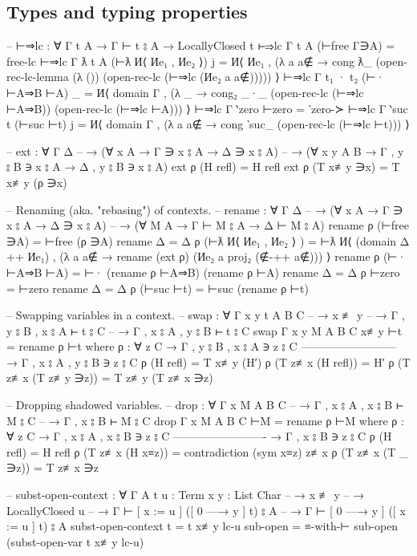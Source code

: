 \documentclass[logo,bsc,singlespacing,parskip,online]{infthesis}
\renewenvironment{code}{\mintedcopy[breaklines,breaksymbolleft=\;]{agda}}{\endmintedcopy}
\begin{document}
\subsection{Types and typing properties}
\label{appendix:types_proofs}
\begin{code}
-- ⊢⇒lc : ∀ {Γ t A} → Γ ⊢ t ⦂ A → LocallyClosed t
⊢⇒lc {Γ} {t} {A} (⊢free Γ∋A) = free-lc
⊢⇒lc {Γ} {ƛ t} {A} (⊢ƛ И⟨ Иe₁ ,  Иe₂ ⟩) j =
  И⟨ Иe₁ , (λ a {a∉} → cong ƛ_
    (open-rec-lc-lemma
      (λ ())
      (open-rec-lc (⊢⇒lc (Иe₂ a {a∉}))))) ⟩
⊢⇒lc {Γ} {t₁ · t₂} (⊢· ⊢A⇒B ⊢A) _ =
  И⟨ domain Γ , (λ _ → cong₂ _·_
    (open-rec-lc (⊢⇒lc ⊢A⇒B)) (open-rec-lc (⊢⇒lc ⊢A))) ⟩
⊢⇒lc {Γ} {‵zero} ⊢zero = ‵zero-≻
⊢⇒lc {Γ} {‵suc t} (⊢suc ⊢t) j =
  И⟨ domain Γ , (λ a {a∉} →
    cong ‵suc_ (open-rec-lc (⊢⇒lc ⊢t))) ⟩

-- ext : ∀ {Γ Δ}
--   → (∀ {x A}     →         Γ ∋ x ⦂ A →         Δ ∋ x ⦂ A)
--   → (∀ {x y A B} → Γ , y ⦂ B ∋ x ⦂ A → Δ , y ⦂ B ∋ x ⦂ A)
ext ρ (H refl) = H refl
ext ρ (T x≢y ∋x) = T x≢y (ρ ∋x)

-- Renaming (aka. "rebasing") of contexts.
-- rename : ∀ {Γ Δ}
--   → (∀ {x A} → Γ ∋ x ⦂ A → Δ ∋ x ⦂ A)
--   → (∀ {M A} → Γ ⊢ M ⦂ A → Δ ⊢ M ⦂ A)
rename ρ (⊢free ∋A) = ⊢free (ρ ∋A)
rename {Δ = Δ} ρ (⊢ƛ И⟨ Иe₁ , Иe₂ ⟩ ) =
  ⊢ƛ И⟨ (domain Δ ++ Иe₁) , (λ a {a∉} →
    rename (ext ρ) (Иe₂ a {proj₂ (∉-++ a∉)})) ⟩
rename ρ (⊢· ⊢A⇒B ⊢A) = ⊢· (rename ρ ⊢A⇒B) (rename ρ ⊢A)
rename {Δ = Δ} ρ ⊢zero = ⊢zero
rename {Δ = Δ} ρ (⊢suc ⊢t) = ⊢suc (rename ρ ⊢t)

-- Swapping variables in a context.
-- swap : ∀ {Γ x y t A B C}
--   → x ≢ y
--   → Γ , y ⦂ B , x ⦂ A ⊢ t ⦂ C
--   → Γ , x ⦂ A , y ⦂ B ⊢ t ⦂ C
swap {Γ} {x} {y} {M} {A} {B} {C} x≢y ⊢t = rename ρ ⊢t
  where
    ρ : ∀ {z C}
      → Γ , y ⦂ B , x ⦂ A ∋ z ⦂ C
        --------------------------
      → Γ , x ⦂ A , y ⦂ B ∋ z ⦂ C
    ρ (H refl) = T x≢y (H′)
    ρ (T z≢x (H refl)) = H′
    ρ (T z≢x (T z≢y ∋z)) = T z≢y (T z≢x ∋z)

-- Dropping shadowed variables.
-- drop : ∀ {Γ x M A B C}
--   → Γ , x ⦂ A , x ⦂ B ⊢ M ⦂ C
--   → Γ , x ⦂ B ⊢ M ⦂ C
drop {Γ} {x} {M} {A} {B} {C} ⊢M = rename ρ ⊢M
  where
    ρ : ∀ {z C}
      → Γ , x ⦂ A , x ⦂ B ∋ z ⦂ C
        -------------------------
      → Γ , x ⦂ B ∋ z ⦂ C
    ρ (H refl) = H refl
    ρ (T z≢x (H x≡z)) = contradiction (sym x≡z) z≢x
    ρ (T z≢x (T _ ∋z)) = T z≢x ∋z

-- subst-open-context : ∀ {Γ A} {t u : Term} {x y : List Char}
--   → x ≢ y
--   → LocallyClosed u
--   → Γ ⊢ [ x := u ] ([ 0 —→ y ] t) ⦂ A
--   → Γ ⊢ [ 0 —→ y ] ([ x := u ] t) ⦂ A
subst-open-context {t = t} x≢y lc-u sub-open =
  ≡-with-⊢ sub-open (subst-open-var t x≢y lc-u)
\end{code}
\end{document}

